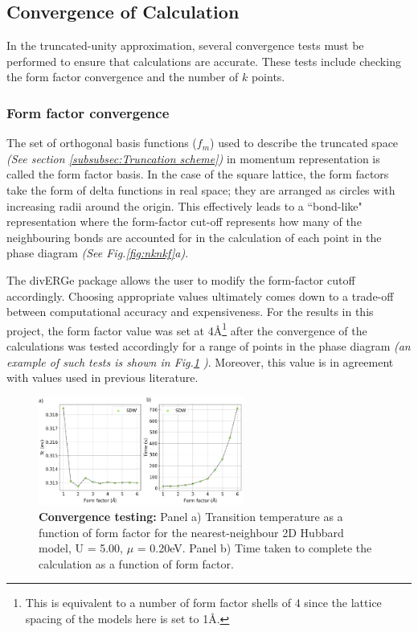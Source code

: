 \documentclass[12pt]{article}
\begin{document}
\subsection{Convergence of Calculation}
\label{subsec:convergence}
In the truncated-unity approximation, several convergence tests must be performed to ensure that calculations are accurate.
These tests include checking the form factor convergence and the number of $k$ points.

\subsubsection{Form factor convergence}

The set of orthogonal basis functions ($f_m$) used to describe the truncated space \textit{(See section \ref{subsubsec:Truncation scheme})}
in momentum representation is called the form factor basis\cite{lichtenstein2018functional}. In the case of the square lattice, 
the form factors take the form of delta functions in real space; they are arranged as circles with increasing radii around the origin. This effectively leads to a ``bond-like" representation where the form-factor cut-off
represents how many of the neighbouring bonds are accounted for in the calculation of each point in the phase diagram \textit{(See Fig.\ref{fig:nknkf}a)}.\par

\medskip


\noindent The divERGe package allows the user to modify the form-factor cutoff accordingly. Choosing appropriate values ultimately comes down to a trade-off 
between computational accuracy and expensiveness. 
For the results in this project, the form factor value was set at 4\AA\footnote{This is equivalent to a number of form factor shells of 4 since the lattice spacing of the models here is set to 1\AA.} after the convergence of  
the calculations was tested accordingly for a range of points in the phase diagram \textit{(an example of such tests is shown in Fig.\ref{fig:Formfactorconvergence} )}. Moreover, this value is in agreement with values used in previous literature\cite{lichtenstein2018functional}. 

\begin{figure}[htbp]  %
    \centering
    \includegraphics[width=0.6\textwidth]{convergence.png}  %
    \caption{\textbf{Convergence testing:} Panel a) Transition temperature as a function of form factor for the nearest-neighbour 2D Hubbard model, U = 5.00, $\mu$ = 0.20eV. Panel b) Time taken to complete the calculation
    as a function of form factor.   }
    \label{fig:Formfactorconvergence}
\end{figure}
\end{document}
